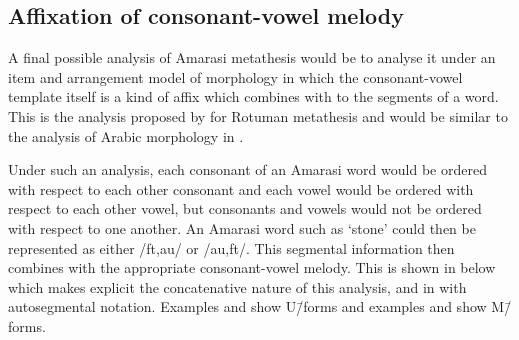\subsection{Affixation of consonant-vowel melody}\label{sec:AffCVMel}
A final possible analysis of Amarasi metathesis
would be to analyse it under an item and arrangement model of morphology
in which the consonant-vowel template itself is a kind of affix
which combines with to the segments of a word.
This is the analysis proposed by \citet[160f]{st94} for Rotuman metathesis
and would be similar to the analysis of Arabic morphology in \cite{mcc81}.

Under such an analysis,
each consonant of an Amarasi word would be ordered with respect to each other consonant
and each vowel would be ordered with respect to each other vowel,
but consonants and vowels would not be ordered with respect to one another.
An Amarasi word such as  `stone'
could then be represented as  either /ft,au/ or /au,ft/.
This segmental information then combines with the appropriate consonant-vowel melody.
This is shown in  below
which makes explicit the concatenative nature of this analysis,
and in  with autosegmental notation.
Examples  and  show U\=/forms
and examples  and  show M\=/forms.

\begin{multicols}{2}
	\begin{exe}
		\label{ex:fatu/faut}
	\end{exe}
\end{multicols}
\begin{multicols}{2}
	\begin{exe}
		\label{as:fatu/faut}
	\end{exe}
\end{multicols}

